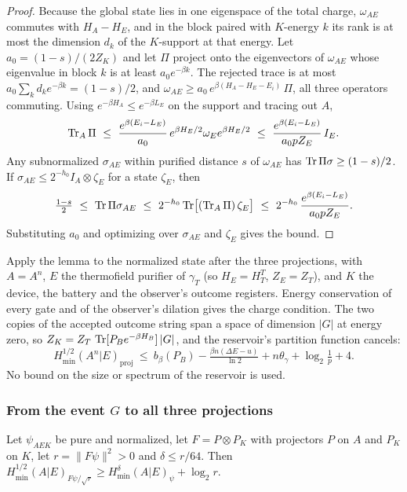 \begin{proof}
Because the global state lies in one eigenspace of the total charge, $\omega_{AE}$ commutes with $H_A-H_E$, and in the block paired with $K$-energy $k$ its rank is at most the dimension $d_k$ of the $K$-support at that energy. Let $a_0=(1-s)/(2Z_K)$ and let $\Pi$ project onto the eigenvectors of $\omega_{AE}$ whose eigenvalue in block $k$ is at least $a_0e^{-\beta k}$. The rejected trace is at most $a_0\sum_kd_ke^{-\beta k}=(1-s)/2$, and $\omega_{AE}\ge a_0\,e^{\beta(H_A-H_E-E_i)}\,\Pi$, all three operators commuting. Using $e^{-\beta H_A}\le e^{-\beta L_E}$ on the support and tracing out $A$,
\[
\Tr_A\Pi\ \le\ \frac{e^{\beta(E_i-L_E)}}{a_0}\,e^{\beta H_E/2}\omega_Ee^{\beta H_E/2}\ \le\ \frac{e^{\beta(E_i-L_E)}}{a_0pZ_E}\,I_E.
\]
Any subnormalized $\sigma_{AE}$ within purified distance $s$ of $\omega_{AE}$ has $\operatorname{Tr}\Pi\sigma\ge(1-s)/2$. If $\sigma_{AE}\le2^{-h_0}I_A\otimes\zeta_E$ for a state $\zeta_E$, then
\[
\tfrac{1-s}2\ \le\ \Tr\Pi\sigma_{AE}\ \le\ 2^{-h_0}\Tr\bigl[(\Tr_A\Pi)\,\zeta_E\bigr]\ \le\ 2^{-h_0}\,\frac{e^{\beta(E_i-L_E)}}{a_0pZ_E}.
\]
Substituting $a_0$ and optimizing over $\sigma_{AE}$ and $\zeta_E$ gives the bound.
\end{proof}

Apply the lemma to the normalized state after the three projections, with $A=A^n$, $E$ the thermofield purifier of $\gamma_T$ (so $H_E=H_T^T$, $Z_E=Z_T$), and $K$ the device, the battery and the observer's outcome registers. Energy conservation of every gate and of the observer's dilation gives the charge condition. The two copies of the accepted outcome string span a space of dimension $|G|$ at energy zero, so $Z_K=Z_T\,\operatorname{Tr}[P_Be^{-\beta H_B}]\,|G|$, and the reservoir's partition function cancels:
\begin{equation}\label{sw:eq:cap}
H^{1/2}_{\min}(A^n|E)_{\mathrm{proj}}\ \le\ b_\beta(P_B)-\tfrac{\beta n(\Delta E-u)}{\ln2}+n\theta_\gamma+\log_2\tfrac1p+4.
\end{equation}
No bound on the size or spectrum of the reservoir is used.

\subsubsection{\texorpdfstring{From the event $G$ to all three projections}{From the event G to all three projections}}

\begin{lemma}\label{sw:lem:postproj}
Let $\psi_{AEK}$ be pure and normalized, let $F=P\otimes P_K$ with projectors $P$ on $A$ and $P_K$ on $K$, let $r=\|F\psi\|^2>0$ and $\delta\le r/64$. Then $H^{1/2}_{\min}(A|E)_{F\psi/\sqrt r}\ge H^{\delta}_{\min}(A|E)_\psi+\log_2r$.
\end{lemma}

